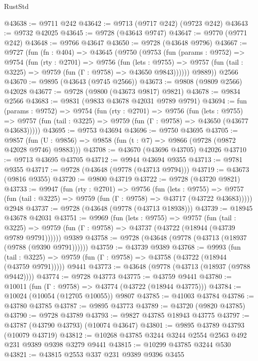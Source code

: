\begin{lexlean}{RustStd}
\begin{coremodule}
@43638 := @9711 @242
@43642 := @9713 (@9717 @242) (@9723 @242)
@43643 := @9732 @42025
@43645 := @9728 (@43643 @9747)
@43647 := @9770 (@9771 @242)
@43648 := @9766 @43647
@43650 := @9728 (@43648 @9796)
@43667 := @9727
    (fun (fn : @404) =>
    @43645
      (@9750
        (@9753
          (fun (params : @9752) =>
          @9754
            (fun (rty : @2701) =>
            @9756
              (fun (lets : @9755) =>
              @9757 (fun (tail : @3225) => @9759 (fun (Γ : @9758) => @43650 @9843))))))
        @9889))
    @2566
@43670 := @9895 (@43643 (@9745 @2566))
@43673 := @9808 (@9809 @2566) @42028
@43677 := @9728 (@9800 (@43673 @9817) @9821)
@43678 := @9834 @2566
@43683 := @9831 (@9833 @43678 @42031 @9789 @9791)
@43694 := fun (params : @9752) =>
  @9754
    (fun (rty : @2701) =>
    @9756
      (fun (lets : @9755) =>
      @9757 (fun (tail : @3225) => @9759 (fun (Γ : @9758) => @43650 (@43677 @43683)))))
@43695 := @9753 @43694
@43696 := @9750 @43695
@43705 := @9857
    (fun (U : @9856) => @9858 (fun (t : @7) => @9866 (@9728 (@9872 @42028 @9746) @9883)))
@43708 := @43670 (@43696 @43705) @42026
@43710 := @9713 @43695 @43705
@43712 := @9944 @43694 @9355
@43713 := @9781 @9355
@43717 := @9728 (@43648 (@9778 (@43713 @9794)))
@43719 := @43673 (@9816 @9355)
@43720 := @9800 @43719
@43722 := @9728 (@43720 @9821)
@43733 := @9947
    (fun (rty : @2701) =>
    @9756
      (fun (lets : @9755) =>
      @9757 (fun (tail : @3225) => @9759 (fun (Γ : @9758) => @43717 (@43722 @43683)))))
    @2948
@43737 := @9728 (@43648 (@9778 (@43713 @18938)))
@43739 := @18945 @43678 @42031
@43751 := @9969
    (fun (lets : @9755) =>
    @9757
      (fun (tail : @3225) =>
      @9759 (fun (Γ : @9758) => @43737 (@43722 (@18944 (@43739 @9789 @9791))))))
    @9389
@43758 := @9728 (@43648 (@9778 (@43713 (@18937 (@9788 (@9390 @9791))))))
@43759 := @43739 @9389
@43768 := @9993
    (fun (tail : @3225) => @9759 (fun (Γ : @9758) => @43758 (@43722 (@18944 (@43759 @9791)))))
    @9441
@43773 := @43648 (@9778 (@43713 (@18937 (@9788 @9442))))
@43774 := @9728 @43773
@43775 := @43759 @9441
@43780 := @10011 (fun (Γ : @9758) => @43774 (@43722 (@18944 @43775)))
@43784 := @10024 (@10054 (@12705 @10055)) @9807
@43785 := @41003 @43784
@43786 := @43780 @43785
@43787 := @9895 @43773
@43789 := @43720 (@9820 @43785)
@43790 := @9728 @43789
@43793 := @9827 @43785 @18943 @43775
@43797 := @43787 (@43790 @43793) (@10074 @43647)
@43801 := @9895 @43789 @43793 (@10079 @43719)
@43812 := @10268 @43785 @3244 @3244 @2554 @2563 @492 @231 @9389 @9398 @3279 @9441
@43815 := @10299 @43785 @3244 @530
@43821 := @43815 @2553 @337 @231 @9389 @9396 @3455

\end{coremodule}
\end{lexlean}
